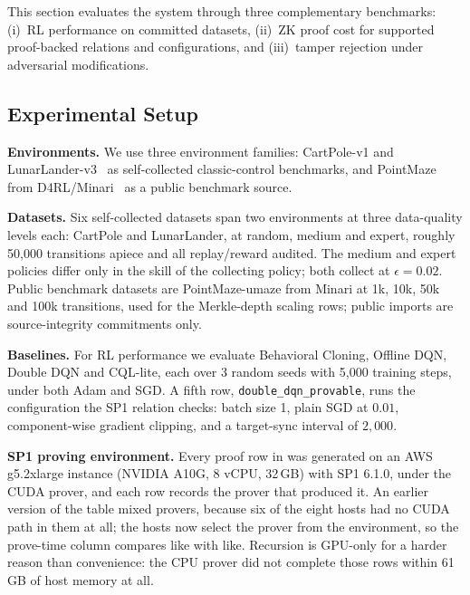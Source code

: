 
This section evaluates the system through three complementary benchmarks:
(i)~RL performance on committed datasets, (ii)~ZK proof cost for supported
proof-backed relations and configurations, and (iii)~tamper rejection under adversarial
modifications.

\subsection{Experimental Setup}

\textbf{Environments.} We use three environment families:
CartPole-v1 and LunarLander-v3~\cite{towers2024gymnasium, brockman2016gym} as self-collected
classic-control benchmarks, and PointMaze from D4RL/Minari~\cite{fu2020d4rl,
minari2024} as a public benchmark source.

\textbf{Datasets.} Six self-collected datasets span two environments at
three data-quality levels each: CartPole and LunarLander, at random, medium and
expert, roughly 50{,}000 transitions apiece and all replay/reward audited. The
medium and expert policies differ only in the skill of the collecting policy;
both collect at $\epsilon=0.02$. Public benchmark datasets are PointMaze-umaze
from Minari at 1k, 10k, 50k and 100k transitions, used for the Merkle-depth
scaling rows; public imports are source-integrity commitments only.

\textbf{Baselines.} For RL performance we evaluate Behavioral Cloning, Offline
DQN, Double DQN and CQL-lite, each over 3 random seeds with 5{,}000 training
steps, under both Adam and SGD. A fifth row, \texttt{double\_dqn\_provable},
runs the configuration the SP1 relation checks: batch size 1, plain SGD at
$0.01$, component-wise gradient clipping, and a target-sync interval of
$2{,}000$.

\textbf{SP1 proving environment.} Every proof row in
 was generated on an AWS g5.2xlarge instance (NVIDIA
A10G, 8 vCPU, 32\,GB) with SP1 6.1.0, under the CUDA prover, and each row
records the prover that produced it. An earlier version of the table mixed
provers, because six of the eight hosts had no CUDA path in them at all; the
hosts now select the prover from the environment, so the prove-time column
compares like with like. Recursion is GPU-only for a harder reason than
convenience: the CPU prover did not complete those rows within 61\,GB of host
memory at all.

